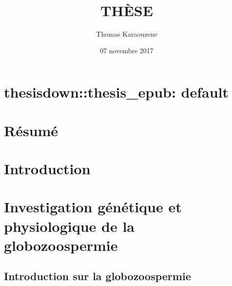 \documentclass[12pt,twoside]{ugathesis}
\title{THÈSE}
\author{Thomas Karaouzene}
\date{07 novembre 2017}
\begin{document}
  \maketitle

\frontmatter %
\pagestyle{empty} %



  \hypersetup{linkcolor=black}
  \setcounter{tocdepth}{3}
  \tableofcontents

  \listoftables

  \listoffigures



\mainmatter %
\pagestyle{fancyplain} %

\chapter{thesisdown::thesis\_epub:
default}\label{thesisdownthesis_epub-default}

\chapter*{Résumé}\label{resume}

\chapter{Introduction}\label{introInf}

\chapter{Investigation génétique et physiologique de la
globozoospermie}\label{globo}

\section{Introduction sur la
globozoospermie}\label{introduction-sur-la-globozoospermie}
\end{document}
